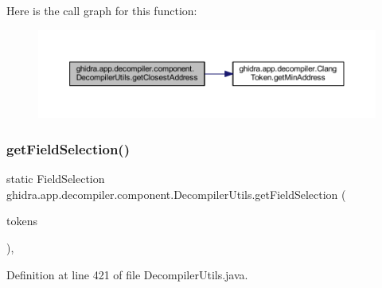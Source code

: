 Here is the call graph for this function\+:
\nopagebreak
\begin{figure}[H]
\begin{center}
\leavevmode
\includegraphics[width=350pt]{classghidra_1_1app_1_1decompiler_1_1component_1_1_decompiler_utils_a84d80e9a65763f50e5b82c91dc8bfde9_cgraph}
\end{center}
\end{figure}
\mbox{\label{classghidra_1_1app_1_1decompiler_1_1component_1_1_decompiler_utils_a20bf8c2ccfda617209d27aed13c1ca1f}} 
\subsubsection{\texorpdfstring{getFieldSelection()}{getFieldSelection()}}
{\footnotesize\ttfamily static Field\+Selection ghidra.\+app.\+decompiler.\+component.\+Decompiler\+Utils.\+get\+Field\+Selection (\begin{DoxyParamCaption}\item[{\mbox{\hyperlink{xml_8hh_ab5ab62f46b3735557c125f91b40ac155}{List}}$<$ \mbox{\hyperlink{classghidra_1_1app_1_1decompiler_1_1_clang_token}{Clang\+Token}} $>$}]{tokens }\end{DoxyParamCaption})\hspace{0.3cm}{\ttfamily [inline]}, {\ttfamily [static]}}



Definition at line 421 of file Decompiler\+Utils.\+java.


